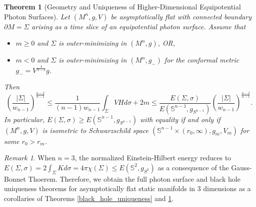 \documentclass[12pt,twoside]{article}
\theoremstyle{plain}
\newtheorem{theorem}{Theorem}[section]
\theoremstyle{definition}
\theoremstyle{remark}
\newtheorem*{remark}{Remark}
\numberwithin{equation}{section}
\begin{document}


\begin{theorem}[Geometry and Uniqueness of Higher-Dimensional Equipotential Photon Surfaces] \label{photon_surface}
Let $(M^{n},g,V)$ be asymptotically flat with connected boundary $\partial M = \Sigma$ arising as a time slice of an equipotential photon surface. Assume that
\begin{itemize}
\item $m \geq 0$ and $\Sigma$ is outer-minimizing in $(M^{n},g)$, OR,
\item $m < 0$ and $\Sigma$ is outer-minimizing in $(M^{n},g_{-})$ for the conformal metric $g_{-}=V^{\frac{4}{n-2}} g$.
\end{itemize}
Then
\begin{equation} \label{photon_surface_bounds}
\left( \frac{|\Sigma|}{w_{n-1}} \right)^{\frac{n-2}{n-1}} \leq \frac{1}{(n-1)w_{n-1}} \int_{\Sigma} VH d\sigma + 2m \leq \frac{E(\Sigma,\sigma)}{E(\mathbb{S}^{n-1},g_{S^{n-1}})} \left( \frac{|\Sigma|}{w_{n-1}} \right)^{\frac{n-2}{n-1}}.
\end{equation}
In particular, $E(\Sigma,\sigma) \geq E(\mathbb{S}^{n-1},g_{S^{n-1}})$ with equality if and only if $(M^{n},g,V)$ is isometric to Schwarzschild space $(\mathbb{S}^{n-1} \times (r_{0},\infty),g_{m},V_{m})$ for some $r_{0} > r_{m}$.     
\end{theorem}
\begin{remark}
When $n=3$, the normalized Einstein-Hilbert energy reduces to $E(\Sigma,\sigma)= 2 \int_{\Sigma} K d\sigma = 4\pi \chi(\Sigma) \leq E(\mathbb{S}^{2},g_{S^{2}})$ as a consequence of the Gauss-Bonnet Thoerem. Therefore, we obtain the full photon surface and black hole uniqueness theorems for asymptotically flat static manifolds in $3$ dimensions as a corollaries of Theorems \ref{black_hole_uniqueness} and \ref{photon_surface}.
\end{remark}
\end{document}
